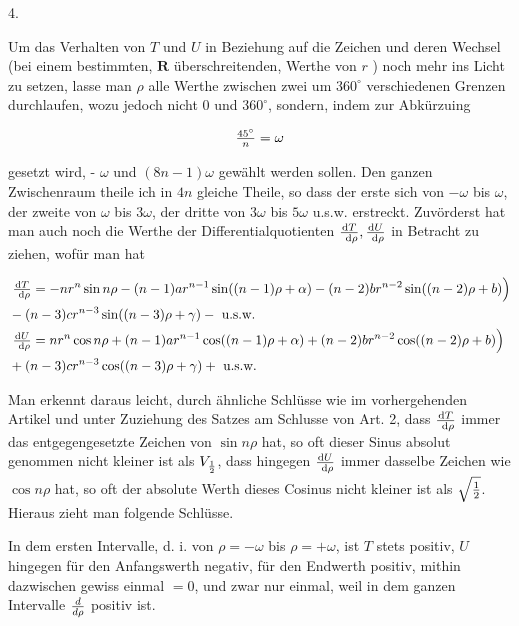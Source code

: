\documentclass[twoside,12pt, showframe]{memoir}
\let\oldfrac\frac
\def\frac#1#2{\mathchoice{\tfrac{#1}{#2}}{\oldfrac{#1}{#2}}{\genfrac{}{}{}{2}{#1}{#2\mathstrut}}{\genfrac{}{}{}{3}{#1}{#2\mathstrut}}}
\begin{document}
4.

Um das Verhalten von \(T\) und \(U\) in Beziehung auf die Zeichen und deren Wechsel (bei einem bestimmten, \(\boldsymbol{R}\) überschreitenden, Werthe von \(r\) ) noch mehr ins Licht zu setzen, lasse man \(\rho\) alle Werthe zwischen zwei um \(360^{\circ}\) verschiedenen Grenzen durchlaufen, wozu jedoch nicht 0 und \(360^{\circ}\), sondern, indem zur Abkürzuing

\[
\frac{45^{\circ}}{n}=\omega
\]

gesetzt wird, - \(\omega\) und \((8 n-1) \omega\) gewählt werden sollen. Den ganzen Zwischenraum theile ich in \(4 n\) gleiche Theile, so dass der erste sich von \(-\omega\) bis \(\omega\), der zweite von \(\omega\) bis \(3 \omega\), der dritte von \(3 \omega\) bis \(5 \omega\) u.s.w. erstreckt. Zuvörderst hat man auch noch die Werthe der Differentialquotienten \(\frac{\mathrm{d} T}{\mathrm{~d} \rho}, \frac{\mathrm{d} U}{\mathrm{~d} \rho}\) in Betracht zu ziehen, wofür man hat

\[
\begin{aligned}
& \left.\frac{\mathrm{d} T}{\mathrm{~d} \rho}=-n r^{n} \sin n \rho-(n-1) a r^{n-1} \sin ((n-1) \rho+\alpha)-(n-2) b r^{n-2} \sin ((n-2) \rho+b)\right) \\
& -(n-3) c r^{n-3} \sin ((n-3) \rho+\gamma)-\text { u.s.w. } \\
& \left.\frac{\mathrm{d} U}{\mathrm{~d} \rho}=n r^{n} \cos n \rho+(n-1) a r^{n-1} \cos ((n-1) \rho+\alpha)+(n-2) b r^{n-2} \cos ((n-2) \rho+b)\right) \\
& +(n-3) c r^{n-3} \cos ((n-3) \rho+\gamma)+\text { u.s.w. }
\end{aligned}
\]

Man erkennt daraus leicht, durch ähnliche Schlüsse wie im vorhergehenden Artikel und unter Zuziehung des Satzes am Schlusse von Art. 2, dass \(\frac{\mathrm{d} T}{\mathrm{~d} \rho}\) immer das entgegengesetzte Zeichen von \(\sin n \rho\) hat, so oft dieser Sinus absolut genommen nicht kleiner ist als \(V_{\frac{1}{2}}\), dass hingegen \(\frac{\mathrm{d} U}{\mathrm{~d} \rho}\) immer dasselbe Zeichen wie \(\cos n \rho\) hat, so oft der absolute Werth dieses Cosinus nicht kleiner ist als \(\sqrt{\frac{1}{2}}\). Hieraus zieht man folgende Schlüsse.

In dem ersten Intervalle, d. i. von \(\rho=-\omega\) bis \(\rho=+\omega\), ist \(T\) stets positiv, \(U\) hingegen für den Anfangswerth negativ, für den Endwerth positiv, mithin dazwischen gewiss einmal \(=0\), und zwar nur einmal, weil in dem ganzen Intervalle \(\frac{d}{d \rho}\) positiv ist.
\end{document}
